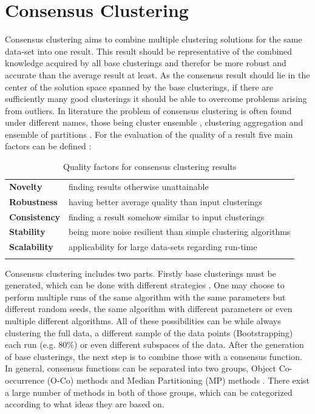 \documentclass[
	a4paper,
	english,
	twoside,
	openright,               
	11pt                            
	]{report}
\begin{document}
\section{Consensus Clustering}\label{sec:consensus}
Consensus clustering aims to combine multiple clustering solutions for the same data-set into one result. This result should be representative of the combined knowledge acquired by all base clusterings and therefor be more robust and accurate than the average result at least. As the consensus result should lie in the center of the solution space spanned by the base clusterings, if there are sufficiently many good clusterings it should be able to overcome problems arising from outliers. In literature the problem of consensus clustering is often found under different names, those being cluster ensemble \cite{BOONGOEN20181}, clustering aggregation \cite{Gionis2005ClusteringA} and ensemble of partitions \cite{ensemblepartitions}. For the evaluation of the quality of a result five main factors can be defined \cite{Ghaemi2009ASC,survey1}:\newline

\begin{table}[ht]

\begin{tabular}{ll}
	\textbf{Novelty} & finding results otherwise unattainable \\
	\textbf{Robustness} & having better average quality than input clusterings \\
	\textbf{Consistency}   & finding a result somehow similar to input clusterings \\
	\textbf{Stability} & being more noise resilient than simple clustering algorithms \\
	\textbf{Scalability} & applicability for large data-sets regarding run-time \\
	&
\end{tabular}
\caption{Quality factors for consensus clustering results}
\end{table}

Consensus clustering includes two parts. Firstly base clusterings must be generated, which can be done with different strategies \cite{BOONGOEN20181}. One may choose to perform multiple runs of the same algorithm with the same parameters but different random seeds, the same algorithm with different parameters or even multiple different algorithms. All of these possibilities can be while always clustering the full data, a different sample of the data points (Bootstrapping) \cite{bootstrapping} each run (e.g. 80\%) or even different subspaces of the data. After the generation of base clusterings, the next step is to combine those with a consensus function. In general, consensus functions can be separated into two groups, Object Co-occurrence (O-Co) methods and Median Partitioning (MP) methods \cite{survey1}. There exist a large number of methods in both of those groups, which can be categorized according to what ideas they are based on.
\end{document}
